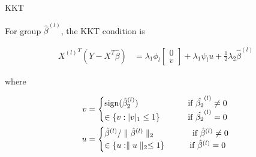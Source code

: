 \documentclass[12pt]{article}
\begin{document}
KKT \cite{tibshirani2013lasso}

For group $\hat{\beta}^{(l)}$, the KKT condition is 

\begin{equation} \label{KKT}
  \begin{split}
  {X^{(l)}}^T(Y-X^T\hat{\beta}) &= \lambda_1\phi_l \begin{bmatrix}
         0 \\
         v 
       \end{bmatrix}
       + \lambda_1\psi_lu+\frac{1}{2}\lambda_2\hat{\beta}^{(l)}
  \end{split}
\end{equation}

where

\begin{align}
v & = \begin{cases}
  \text{sign}(\hat{\beta}_2^{(l)}) & \text{ \qquad  if $\hat{\beta_2}^{(l)}\neq 0$} \\
  \in\{v:|v|_1\leq 1\}&  \text{ \qquad  if $\hat{\beta_2}^{(l)}= 0$} 
\end{cases}
\\
u & = \begin{cases} 
  \hat{\beta}^{(l)}/\parallel \hat{\beta}^{(l)} \parallel_2 & 
  \text{ \qquad  if $\hat{\beta}^{(l)}\neq 0$} \\
  \in \{u:\parallel u\parallel_2\leq 1\} & \text{\qquad if $\hat{\beta}^{(l)}= 0$}
\end{cases} 
\end{align}
\end{document}
